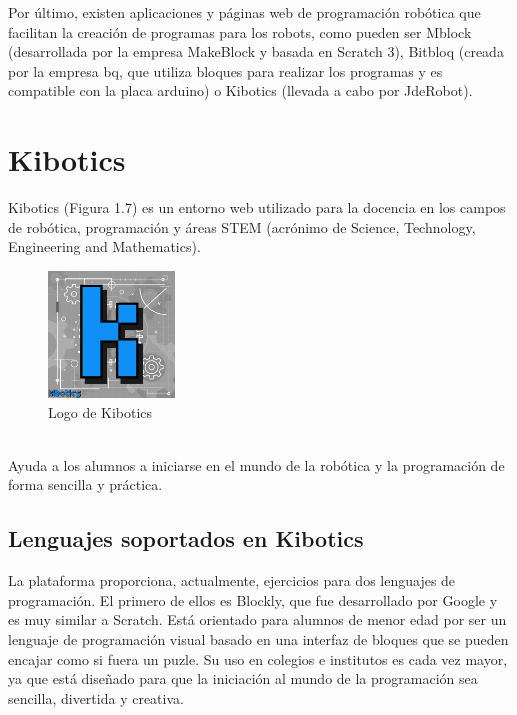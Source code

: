 \documentclass{report}
\begin{document}
Por último, existen aplicaciones y páginas web de programación robótica que facilitan la creación de programas para los robots, como pueden ser Mblock (desarrollada por la empresa MakeBlock y basada en Scratch 3), Bitbloq (creada por la empresa bq, que utiliza bloques para realizar los programas y es compatible con la placa arduino) o Kibotics (llevada a cabo por JdeRobot).
\\

\section{Kibotics}

Kibotics (Figura 1.7) es un entorno web utilizado para la docencia en los campos de robótica, programación y áreas STEM (acrónimo de Science, Technology, Engineering and Mathematics).
\\
\begin{figure}[h!]
  \centering
    \includegraphics[width=0.3\textwidth]{images/logo_kibotics.png}
  \caption{Logo de Kibotics}
  \label{Logo de Kibotics}
\end{figure}
\\


Ayuda a los alumnos a iniciarse en el mundo de la robótica y la programación de forma sencilla y práctica.
\\

\subsection{Lenguajes soportados en Kibotics}

La plataforma proporciona, actualmente, ejercicios para dos lenguajes de programación. El primero de ellos es Blockly, que fue desarrollado por Google y es muy similar a Scratch. Está orientado para alumnos de menor edad por ser un lenguaje de programación visual basado en una interfaz de bloques que se pueden encajar como si fuera un puzle. Su uso en colegios e institutos es cada vez mayor, ya que está diseñado para que la iniciación al mundo de la programación sea sencilla, divertida y creativa.
\\
\end{document}
